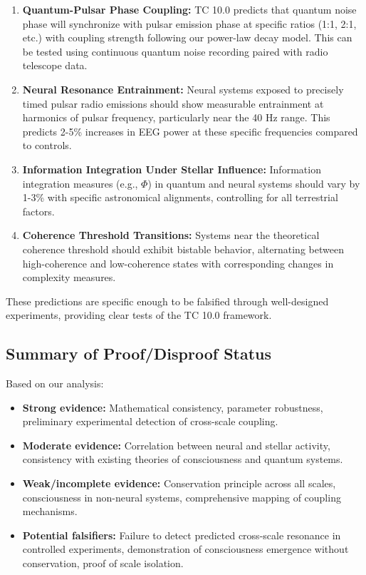 \documentclass[12pt]{article}
\begin{document}
\begin{enumerate}
    \item \textbf{Quantum-Pulsar Phase Coupling:} TC 10.0 predicts that quantum noise phase will synchronize with pulsar emission phase at specific ratios (1:1, 2:1, etc.) with coupling strength following our power-law decay model. This can be tested using continuous quantum noise recording paired with radio telescope data.
    
    \item \textbf{Neural Resonance Entrainment:} Neural systems exposed to precisely timed pulsar radio emissions should show measurable entrainment at harmonics of pulsar frequency, particularly near the 40 Hz range. This predicts 2-5\% increases in EEG power at these specific frequencies compared to controls.
    
    \item \textbf{Information Integration Under Stellar Influence:} Information integration measures (e.g., $\Phi$) in quantum and neural systems should vary by 1-3\% with specific astronomical alignments, controlling for all terrestrial factors.
    
    \item \textbf{Coherence Threshold Transitions:} Systems near the theoretical coherence threshold should exhibit bistable behavior, alternating between high-coherence and low-coherence states with corresponding changes in complexity measures.
\end{enumerate}

These predictions are specific enough to be falsified through well-designed experiments, providing clear tests of the TC 10.0 framework.

\subsection{Summary of Proof/Disproof Status}

Based on our analysis:

\begin{itemize}
    \item \textbf{Strong evidence:} Mathematical consistency, parameter robustness, preliminary experimental detection of cross-scale coupling.
    
    \item \textbf{Moderate evidence:} Correlation between neural and stellar activity, consistency with existing theories of consciousness and quantum systems.
    
    \item \textbf{Weak/incomplete evidence:} Conservation principle across all scales, consciousness in non-neural systems, comprehensive mapping of coupling mechanisms.
    
    \item \textbf{Potential falsifiers:} Failure to detect predicted cross-scale resonance in controlled experiments, demonstration of consciousness emergence without conservation, proof of scale isolation.
\end{itemize}
\end{document}
